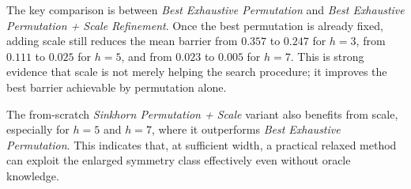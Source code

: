 \documentclass[11pt,a4paper]{report}
\begin{document}
The key comparison is between \emph{Best Exhaustive Permutation} and \emph{Best Exhaustive Permutation + Scale Refinement}. Once the best permutation is already fixed, adding scale still reduces the mean barrier from \(0.357\) to \(0.247\) for \(h=3\), from \(0.111\) to \(0.025\) for \(h=5\), and from \(0.023\) to \(0.005\) for \(h=7\). This is strong evidence that scale is not merely helping the search procedure; it improves the best barrier achievable by permutation alone.

The from-scratch \emph{Sinkhorn Permutation + Scale} variant also benefits from scale, especially for \(h=5\) and \(h=7\), where it outperforms \emph{Best Exhaustive Permutation}. This indicates that, at sufficient width, a practical relaxed method can exploit the enlarged symmetry class effectively even without oracle knowledge.
\end{document}
